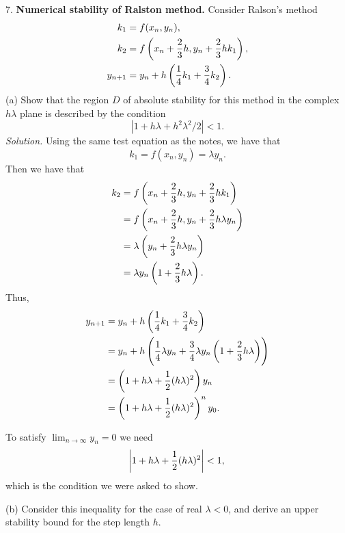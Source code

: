 \documentclass{article}
\begin{document}
7. \textbf{Numerical stability of Ralston method.}
Consider Ralson's method
%
\begin{align*}
    k_1 &= f(x_n, y_n), \\
    k_2 &= f\del{x_n + \frac{2}{3} h, y_n + \frac{2}{3}h k_1}, \\
    y_{n + 1} &= y_n + h \del{\frac{1}{4} k_1 + \frac{3}{4} k_2}.
\end{align*}
%
(a) Show that the region $D$ of absolute stability for this method in the complex $h \lambda$ plane is
described by the condition
%
\begin{equation*}
    |1 + h \lambda + h^2 \lambda^2 / 2| < 1.
\end{equation*}
%
\textit{Solution.}
Using the same test equation as the notes, we have that
%
\begin{equation*}
    k_1 = f(x_n, y_n) = \lambda y_n
    .
\end{equation*}
%
Then we have that
%
\begin{align*}
    k_2
    &= f\del{x_n + \frac{2}{3} h, y_n + \frac{2}{3}h k_1}
    \\
    &= f\del{x_n + \frac{2}{3} h, y_n + \frac{2}{3}h \lambda y_n}
    \\
    &= \lambda \del{y_n + \frac{2}{3}h \lambda y_n}
    \\
    &= \lambda y_n \del{1 + \frac{2}{3}h \lambda}
    .
\end{align*}
%
Thus,
%
\begin{align*}
    y_{n + 1}
    &= y_n + h \del{\frac{1}{4} k_1 + \frac{3}{4} k_2}
    \\
    &= y_n + h \del{\frac{1}{4} \lambda y_n + \frac{3}{4} \lambda y_n \del{1 + \frac{2}{3}h \lambda}}
    \\
    &= \del{1 + h \lambda + \frac{1}{2} (h \lambda)^2} y_n
    \\
    &= \del{1 + h \lambda + \frac{1}{2} (h \lambda)^2}^n y_0
    .
\end{align*}

To satisfy $\lim_{n \to \infty} y_n = 0$ we need
%
\begin{equation*}
    \envert{1 + h \lambda + \frac{1}{2} (h \lambda)^2} < 1
    ,
\end{equation*}
%
which is the condition we were asked to show.

\vspace{5mm}

(b) Consider this inequality for the case of real $\lambda < 0$, and derive an upper stability bound for the step length $h$.
\end{document}
